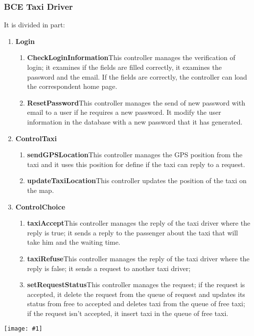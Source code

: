 \documentclass[11pt, a4paper,titlepage]{article}
\newcommand{\image}[1]{
	\begin{center}
		\noindent \texttt{[image: \#1]}
	\end{center}
	}
\begin{document}
\subsubsection{BCE Taxi Driver}
It is divided in part:
\begin{enumerate}
	\item \textbf{Login}
	\begin{enumerate}
		\item \textbf{CheckLoginInformation}This controller manages the verification of login; it 
		examines if the fields are filled correctly, it examines the password and the email. 
		If the fields are correctly, the controller can load the correspondent home page.
		\item \textbf{ResetPassword}This controller manages the send of new password with email to a 
		user if he requires a new password.
		It modify the user information in the database with a new password that it has 
		generated.
	\end{enumerate}
	\item \textbf{ControlTaxi}
	\begin{enumerate}
		\item \textbf{sendGPSLocation}This controller manages the GPS position from the taxi and it 
		uses this position for define if the taxi can reply to a request.
		\item \textbf{updateTaxiLocation}This controller updates the position of the taxi on the map.
	\end{enumerate}	
	\item \textbf{ControlChoice}
	\begin{enumerate}
		\item \textbf{taxiAccept}This controller manages the reply of the taxi driver where the reply   
		is true; it sends a reply to the passenger about the taxi that will take him and the waiting time.
		\item \textbf{taxiRefuse}This controller manages the reply of the taxi driver where the reply  
		is false; it sends a request to another taxi driver;
		\item \textbf{setRequestStatus}This controller manages the request; if the request is accepted, 
		it delete the request from the queue of request and updates its status from free to 
		accepted and deletes taxi from the queue of free taxi; if the request isn’t accepted, it insert taxi in the queue of free taxi.
	\end{enumerate}
\end{enumerate}
\image{BCETaxiDriver.png}
\newpage
\end{document}
